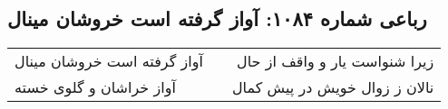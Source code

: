 \begin{center}
\section*{رباعی شماره ۱۰۸۴: آواز گرفته است خروشان مینال}
\label{sec:1084}
\begin{longtable}{l p{0.5cm} r}
آواز گرفته است خروشان مینال
&&
زیرا شنواست یار و واقف از حال
\\
آواز خراشان و گلوی خسته
&&
نالان ز زوال خویش در پیش کمال
\\
\end{longtable}
\end{center}
